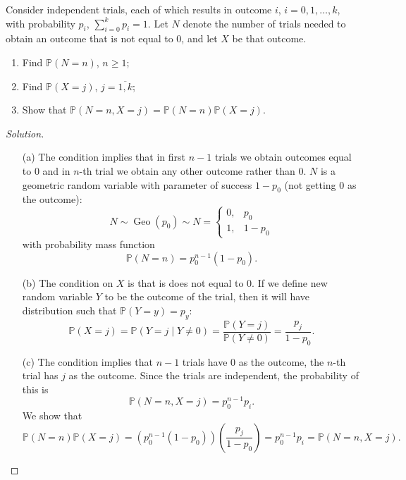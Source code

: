 \documentclass{article}[12pt]
\newenvironment{solution}
  {\renewcommand\qedsymbol{$\blacksquare$}\begin{proof}[Solution]}
  {\end{proof}}
\newenvironment{problem}[1]
  {\renewcommand\theinnercustomprblm{#1}\innercustomprblm}
  {\endinnercustomprblm}
\DeclareMathOperator{\Geo}{Geo}
\renewcommand{\P}{\mathbb{P}}
\begin{document}
\begin{problem}{6.24(a-c)}\normalfont
Consider independent trials, each of which results in outcome $i$, $i=0,1,\ldots,k$, with probability $p_{i}$, $\sum_{i=0}^{k}p_{i} = 1$.
Let $N$ denote the number of trials needed to obtain an outcome that is not equal to $0$, and let $X$ be that outcome.
\begin{enumerate}[label=(\alph*)]
    \item Find $\P(N = n)$, $n \geqslant 1$;
    \item Find $\P(X = j)$, $j = \overline{1,k}$;
    \item Show that $\P(N = n, X = j) = \P(N = n)\P(X = j)$.
\end{enumerate}
\end{problem}
\begin{solution}
\text{}
\begin{enumerate}
    \item[(a)] The condition implies that in first $n-1$ trials we obtain outcomes equal to $0$ and in $n$-th trial we obtain any other outcome rather than $0$.
    $N$ is a geometric random variable with parameter of success $1 - p_{0}$ (not getting $0$ as the outcome):
    \begin{equation*}
        N\sim\Geo(p_{0})\sim N =\begin{cases} 0, & p_{0} \\ 1, & 1- p_{0}\end{cases}
    \end{equation*}
    with probability mass function
    \begin{equation*}
        \P(N = n) = p_{0}^{n-1}(1 - p_{0}).
    \end{equation*}
    \item[(b)] The condition on $X$ is that is does not equal to $0$.
    If we define new random variable $Y$ to be the outcome of the trial, then it will have distribution such that $\P(Y = y) = p_{y}$:
    \begin{equation*}
        \P(X = j) =\P(Y = j\mid Y\neq 0) = \frac{\P(Y = j)}{\P(Y\neq 0)} = \frac{p_{j}}{1 - p_{0}}.
    \end{equation*}
    \item[(c)] The condition implies that $n-1$ trials have $0$ as the outcome, the $n$-th trial has $j$ as the outcome.
    Since the trials are independent, the probability of this is
    \begin{equation*}
        \P(N = n, X = j) = p_{0}^{n-1}p_{i}.
    \end{equation*}
    We show that
    \begin{equation*}
        \P(N = n)\P(X = j) = \left(p_{0}^{n-1}(1 - p_{0})\right)\left(\frac{p_{j}}{1 - p_{0}}\right) = p_{0}^{n-1}p_{i} = \P(N = n, X = j).
    \end{equation*}
\end{enumerate}
\end{solution}
\end{document}
